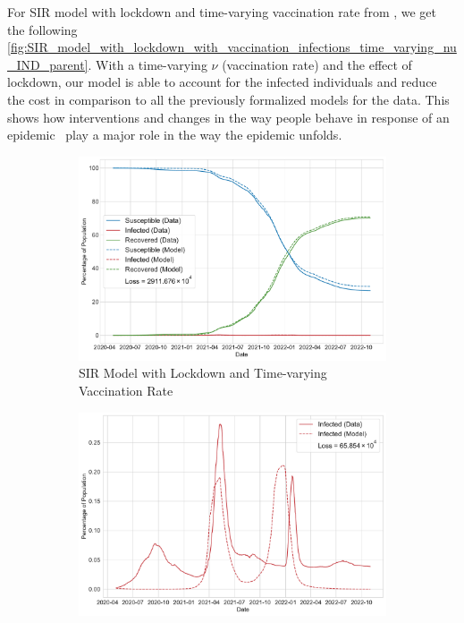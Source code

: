 \documentclass[tikz,fleqn,12pt]{wlscirep}
\begin{document}
For SIR model with lockdown and time-varying vaccination rate from , we get the following \cref{fig:SIR_model_with_lockdown_with_vaccination_infections_time_varying_nu_IND_parent}. With a time-varying $\nu$ (vaccination rate) and the effect of lockdown, our model is able to account for the infected individuals and reduce the cost in comparison to all the previously formalized models for the data. This shows how interventions and changes in the way people behave in response of an epidemic~\cite{Caldwell2021} play a major role in the way the epidemic unfolds.

\begin{figure}[htbp!]
  \centering
  \begin{subfigure}[t]{\textwidth}
    \centering
    \includegraphics[scale=0.35]{images/SIR_model_with_lockdown_with_vaccination_time_varying_nu_IND.pdf}
    \caption{SIR Model with Lockdown and Time-varying Vaccination Rate}
    \label{fig:SIR_model_with_lockdown_with_vaccination_time_varying_nu_IND}
  \end{subfigure}
  \begin{subfigure}[t]{\textwidth}
    \centering
    \includegraphics[scale=0.35]{images/SIR_model_with_lockdown_with_vaccination_time_varying_nu_infections_IND.pdf}

\end{subfigure}
\end{figure}
\end{document}
